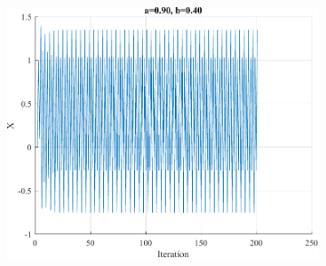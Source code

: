 \begin{figure}[H]
\begin{subfigure}{0.3\textwidth}
		\caption{}
	\end{subfigure}
	\begin{subfigure}{0.3\textwidth}
		\centering
		\includegraphics[width=\textwidth]{../Problem 3/prob3_(d)_a_0.90_b_0.40.pdf}
		\caption{}
	\end{subfigure}
	\caption{}
	\label{fig:prob3_d_multiple_a}
\end{figure}
